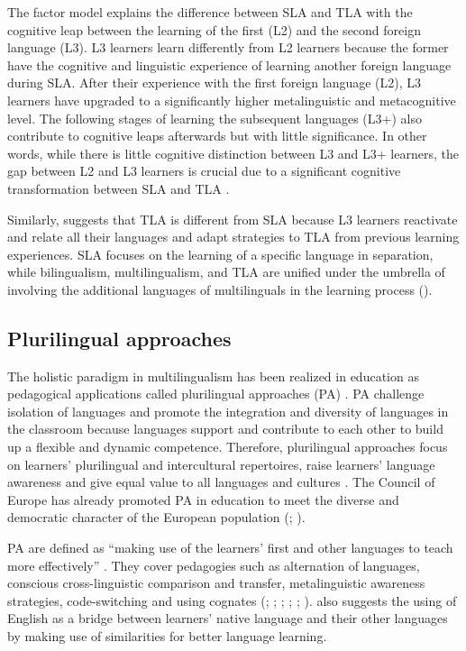 \documentclass[output=paper]{../langscibook}
\begin{document}
The factor model \citep{Hufeisen2004} explains the difference between SLA and TLA with the cognitive leap between the learning of the first (L2) and the second foreign language (L3). L3 learners learn differently from L2 learners because the former have the cognitive and linguistic experience of learning another foreign language during SLA. After their experience with the first foreign language (L2), L3 learners have upgraded to a significantly higher metalinguistic and metacognitive level. The following stages of learning the subsequent languages (L3+) also contribute to cognitive leaps afterwards but with little significance.  In other words, while there is little cognitive distinction between L3 and L3+ learners, the gap between L2 and L3 learners is crucial due to a significant cognitive transformation between SLA and TLA \citep{Hufeisen2004}.

Similarly, \citet{Cenoz2013b} suggests that TLA is different from SLA because L3 learners reactivate and relate all their languages and adapt strategies to TLA from previous learning experiences. SLA focuses on the learning of a specific language in separation, while bilingualism, multilingualism, and TLA are unified under the umbrella of involving the additional languages of multilinguals in the learning process (\citealt{CenozGorter2011}).



\subsection{Plurilingual approaches}



The holistic paradigm in multilingualism has been realized in education as pedagogical applications called plurilingual approaches (PA) \citep{CouncilOfEurope2001,BeaccoEtAl2010,Cenoz2013a}. PA challenge isolation of languages and promote the integration and diversity of languages in the classroom because languages support and contribute to each other to build up a flexible and dynamic competence. Therefore, plurilingual approaches focus on learners' plurilingual and intercultural repertoires, raise learners’ language awareness and give equal value to all languages and cultures \citep{BeaccoEtAl2010}. The Council of Europe has already promoted PA in education to meet the diverse and democratic character of the European population (\citealt{CouncilOfEurope2001}; \citealt{BeaccoEtAl2010}).

PA are defined as “making use of the learners’ first and other languages to teach more effectively” \citep[102]{Otwinowska2014}. They cover pedagogies such as alternation of languages, conscious cross-linguistic comparison and transfer, metalinguistic awareness strategies, code-switching and using cognates (\citealt{CouncilOfEurope2001}; \citealt{BeaccoEtAl2010}; \citealt{HerdinaJessner2002}; \citealt{HufeisenNeuner2004}; \citealt{Cenoz2013b};  \citealt{JessnerEtAl2016}).  \citet{Otwinowska2014} also suggests the using of English as a bridge between learners’ native language and their other languages by making use of similarities for better language learning.
\end{document}
